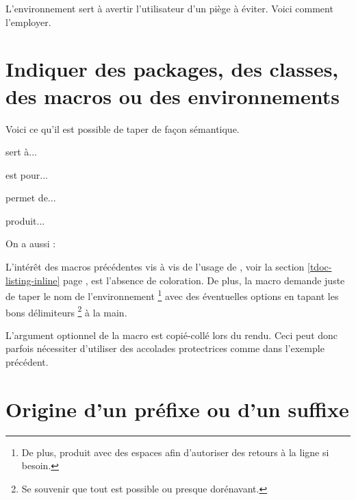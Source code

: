 L'environnement  sert à avertir l'utilisateur d'un piège à éviter. Voici comment l'employer.




\section{Indiquer des packages, des classes, des macros ou des environnements}

Voici ce qu'il est possible de taper de façon sémantique.


\begin{tdoclatex}[sbs]
 sert à...

 est pour...

 permet de...

 produit...

On a aussi :

\end{tdoclatex}


\begin{tdocrem}
    L'intérêt des macros précédentes vis à vis de l'usage de , voir la section \ref{tdoc-listing-inline} page \pageref{tdoc-listing-inline}, est l'absence de coloration.
    De plus, la macro  demande juste de taper le nom de l'environnement
    \footnote{
        De plus,  produit  avec des espaces afin d'autoriser des retours à la ligne si besoin.
    }
    avec des éventuelles options en tapant les bons délimiteurs
    \footnote{
        Se souvenir que tout est possible ou presque dorénavant.
    }
    à la main.
\end{tdocrem}


\begin{tdocwarn}
    L'argument optionnel de la macro  est copié-collé lors du rendu. Ceci peut donc parfois nécessiter d'utiliser des accolades protectrices comme dans l'exemple précédent.
\end{tdocwarn}




\section{Origine d'un préfixe ou d'un suffixe}

